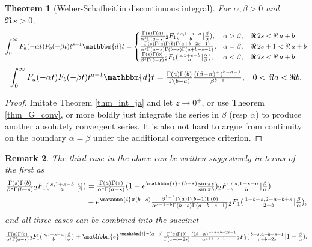 \documentclass[12pt]{article}
\newcommand{\ee}[0] {\mathbbm{e}}
\newcommand{\ii}[0] {\mathbbm{i}}
\newcommand{\dd}[0] {\mathbbm{d}}
\numberwithin{equation}{section}
\newtheorem{theorem}{Theorem}[section]
\newtheorem{remark}[theorem]{Remark}
\newcommand{\Head}[3] {{}_{#1}{#2}_{#3}}
\newcommand{\ArgS}[3] {( \begin{smallmatrix} #1 \\ #2 \end{smallmatrix} | {#3})}
\newcommand{\HypJ}[2] {F_{#1}(#2)}
\begin{document}
\begin{theorem}[Weber-Schafheitlin discontinuous integral]
\label{thm_int_jajb}
For $\alpha,\beta > 0$ and $\Re \, s > 0$,
\begin{equation*}
\int_{0}^{\infty} \HypJ{a}{-\alpha t} \HypJ{b}{-\beta t} t^{s-1} \dd t = 
\begin{cases}
\tfrac{\Gamma(s) \Gamma(a)}{\alpha^s \Gamma(a-s)}  \Head{2}{F}{1} \ArgS{s,1+s-a}{b}{\tfrac{\beta}{\alpha}}\text{,} & \alpha > \beta, \quad \Re\, 2s < \Re \, a + b\\
\tfrac{\Gamma(s) \Gamma(a)\Gamma(b)\Gamma(a+b-2s-1)}{\alpha^s \Gamma(a-s)\Gamma(b-s)\Gamma(a+b-s-1)}\text{,} & \alpha = \beta, \quad \Re \, 2s+1 < \Re \, a + b\\
\tfrac{\Gamma(s) \Gamma(b)}{\beta^s \Gamma(b-s)}  \Head{2}{F}{1} \ArgS{s,1+s-b}{a}{\tfrac{\alpha}{\beta}}\text{,} & \alpha < \beta, \quad \Re\, 2s < \Re \, a + b
\end{cases}
\end{equation*}
\begin{equation*}
\int_{0}^{\infty} \HypJ{a}{-\alpha t} \HypJ{b}{-\beta t} t^{a-1} \dd t =
\tfrac{\Gamma(a)\Gamma(b)}{\Gamma(b-a)} \tfrac{ ((\beta - \alpha)^{+})^{b-a-1} }{ \beta^{b-1} } \text{,} \quad 0 < \Re a < \Re b\text{.}
\end{equation*}
\end{theorem}
\begin{proof}
Imitate Theorem \ref{thm_int_ja} and let $z \to 0^+$, or use Theorem \ref{thm_G_conv}, or more boldly just integrate the series in $\beta$ (resp $\alpha$) to produce another absolutely convergent series. It is also not hard to argue from continuity on the boundary $\alpha = \beta$ under the additional convergence criterion.
\end{proof}
\begin{remark}
The third case in the above can be written suggestively in terms of the first as
\begin{align*}
\tfrac{\Gamma(s) \Gamma(b)}{\beta^s \Gamma(b-s)}  \Head{2}{F}{1} \ArgS{s,1+s-b}{a}{\tfrac{\alpha}{\beta}} &= \tfrac{\Gamma (a) \Gamma (s)}{\alpha^{s} \Gamma (a-s)}(1-e^{\ii
   \pi  (b-s)} \tfrac{\sin \pi s}{\sin \pi  b}) \Head2F1 \ArgS{s,1+s-a}{b}{\tfrac{\beta }{\alpha}}\\
  & - e^{\ii \pi  (b-s)} \tfrac{\beta ^{1-b} \Gamma (a) \Gamma (b-1) \Gamma (b)}{\alpha^{s+1-b} \Gamma (b-s) \Gamma (a+b-s-1)} \Head2F1 \ArgS{1-b+s,2-a-b+s}{2-b}{\tfrac{\beta}{\alpha }}\text{,}
\end{align*}
and all three cases can be combined into the succinct
\begin{equation*}
\tfrac{\Gamma (a) \Gamma (s)}{\alpha ^{s} \Gamma(a-s)} \Head2F1 \ArgS{s,1+s-a}{b}{\tfrac{\beta }{\alpha}} + \ee ^{\ii \pi (a-s)} \tfrac{\Gamma (a) \Gamma (b)}{\Gamma (a+b-2 s)} \tfrac{((\beta -\alpha)^{+})^{a+b-2s-1}}{\alpha^{a+b-s-1}} \Head2F1 \ArgS{b-s,a+b-s-1}{a+b-2 s}{1-\tfrac{\beta }{\alpha}}\text{.}
\end{equation*}
\end{remark}
\end{document}
